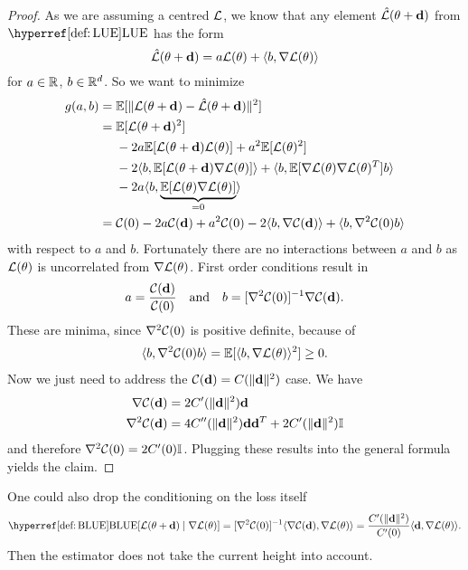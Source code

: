 \begin{proof}
	As we are assuming a centred \(\mathcal{L}\), we know that any  element
	\(\hat{\mathcal{L}}(\theta + \mathbf{d})\) from \(\LUE\) has the form
	\begin{equation*}
		\hat{\mathcal{L}}(\theta + \mathbf{d})
		= a\mathcal{L}(\theta) + \langle b, \nabla\mathcal{L}(\theta)\rangle
	\end{equation*}
	for \(a\in\mathbb{R}\), \(b\in \mathbb{R}^d\). So we want to minimize 
	\begin{align*}
		g(a,b)
		&=\mathbb{E}[\|\mathcal{L}(\theta +\mathbf{d}) - \hat{\mathcal{L}}(\theta + \mathbf{d})\|^2]\\
		&= \begin{aligned}[t]
			&\mathbb{E}[\mathcal{L}(\theta +\mathbf{d})^2]\\
			&- 2a\mathbb{E}[\mathcal{L}(\theta + \mathbf{d})\mathcal{L}(\theta)] + a^2 \mathbb{E}[\mathcal{L}(\theta)^2]\\
			&- 2\langle b, \mathbb{E}[\mathcal{L}(\theta + \mathbf{d})\nabla\mathcal{L}(\theta)]\rangle
			+ \langle b, \mathbb{E}[\nabla\mathcal{L}(\theta)\nabla\mathcal{L}(\theta)^T] b\rangle\\
			&- 2a\langle b, \underbrace{\mathbb{E}[\mathcal{L}(\theta)\nabla\mathcal{L}(\theta)]}_{=0}\rangle
		\end{aligned}\\
		&=\mathcal{C}(0) - 2a\mathcal{C}(\mathbf{d}) + a^2 \mathcal{C}(0)
		- 2\langle b, \nabla\mathcal{C}(\mathbf{d})\rangle
		+ \langle b, \nabla^2\mathcal{C}(0) b\rangle
	\end{align*}
	with respect to \(a\) and \(b\). Fortunately there are no interactions
	between \(a\) and \(b\) as \(\mathcal{L}(\theta)\) is uncorrelated from
	\(\nabla\mathcal{L}(\theta)\). First order conditions result in
	\begin{equation*}
		a= \frac{\mathcal{C}(\mathbf{d})}{\mathcal{C}(0)}
		\quad \text{and} \quad
		b = [\nabla^2 \mathcal{C}(0)]^{-1}\nabla \mathcal{C}(\mathbf{d}).
	\end{equation*}
	These are minima, since \(\nabla^2\mathcal{C}(0)\) is positive definite, because of
	\begin{align*}
		\langle b, \nabla^2\mathcal{C}(0) b\rangle = \mathbb{E}[\langle b, \nabla\mathcal{L}(\theta)\rangle^2] \ge 0.
	\end{align*}
	Now we just need to address the \(\mathcal{C}(\mathbf{d}) = C(\|\mathbf{d}\|^2)\) case. We have
	\begin{align*}
		\nabla \mathcal{C}(\mathbf{d}) &= 2C'(\|\mathbf{d}\|^2) \mathbf{d}\\
		\nabla^2 \mathcal{C}(\mathbf{d}) &= 4 C''(\|\mathbf{d}\|^2) \mathbf{d} \mathbf{d}^T + 2C'(\|\mathbf{d}\|^2)\mathbb{I}
	\end{align*}
	and therefore \(\nabla^2\mathcal{C}(0) = 2C'(0)\mathbb{I}\). Plugging these results
	into the general formula yields the claim.
\end{proof}
\begin{remark}
	One could also drop the conditioning on the loss itself
	\begin{equation*}
		\BLUE[\Loss(\param + \step)\mid \nabla\Loss(\param)]
		= [\nabla^2\C(0)]^{-1}\langle\nabla\C(\step), \nabla\Loss(\param)\rangle
		= \frac{\iC'(\|\step\|^2)}{\iC'(0)}\langle \step, \nabla\Loss(\param)\rangle.
	\end{equation*}
	Then the estimator does not take the current height into account.
\end{remark}

